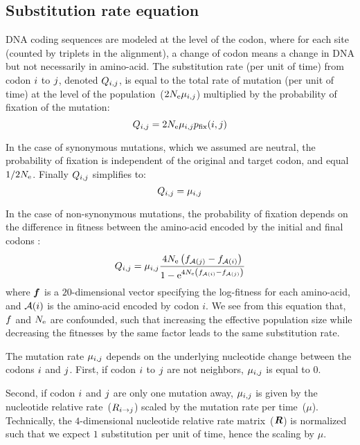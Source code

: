 \subsection{Substitution rate equation}
\label{sec:MutSelEq}
DNA coding sequences are modeled at the level of the codon, where for each site (counted by triplets in the alignment), a change of codon means a change in DNA but not necessarily in amino-acid.
The substitution rate (per unit of time) from codon ${i}$ to ${j}$, denoted $Q_{{i}, {j}}$, is equal to the total rate of mutation (per unit of time) at the level of the population~($2N_{\mathrm{e}}\mu_{{i}, {j}}$) multiplied by the probability of fixation of the mutation:
\begin{equation}
{Q_{{i}, {j}}} = 2 N_{\mathrm{e}} \mu_{{i}, {j}} p_{\mathrm{fix}}({i}, {j})
\end{equation}

In the case of synonymous mutations, which we assumed are neutral, the probability of fixation is independent of the original and target codon, and equal $1/2 N_{\mathrm{e}}$.
Finally ${Q_{{i}, {j}}}$ simplifies to: 
\begin{equation}
Q_{{i}, {j}} = \mu_{{i}, {j}}
\end{equation}

In the case of non-synonymous mutations, the probability of fixation depends on the difference in fitness between the amino-acid encoded by the initial and final codons \citep{Ohta1992}:
\begin{equation}
\label{eq:mutationSelection}
{\submatrix_{\itoj}} = \mu_{\itoj} \dfrac{4 \Ne \left({\fitj - \fiti}\right)}{{1 - \e^{4 \Ne \left({\fiti - \fitj}\right)} }}
\end{equation}
where $\bm{f}$ is a $20$-dimensional vector specifying the log-fitness for each amino-acid, and $\mathcal{A}({i})$ is the amino-acid encoded by codon $i$.
We see from this equation that, $f$ and $N_{\mathrm{e}}$ are confounded, such that increasing the effective population size while decreasing the fitnesses by the same factor leads to the same substitution rate.

The mutation rate $\mu_{{i}, {j}}$ depends on the underlying nucleotide change between the codons ${i}$ and ${j}$.
First, if codon ${i}$ to ${j}$ are not neighbors, $\mu_{{i}, {j}}$ is equal to $0$.

Second, if codon ${i}$ and ${j}$ are only one mutation away, $\mu_{{i}, {j}}$ is given by the nucleotide relative rate~(${R_{{i} \rightarrow {j}}}$) scaled by the mutation rate per time~($\mu$).
Technically, the $4$-dimensional nucleotide relative rate matrix~($\bm{R}$) is normalized such that we expect $1$ substitution per unit of time, hence the scaling by $\mu$.

